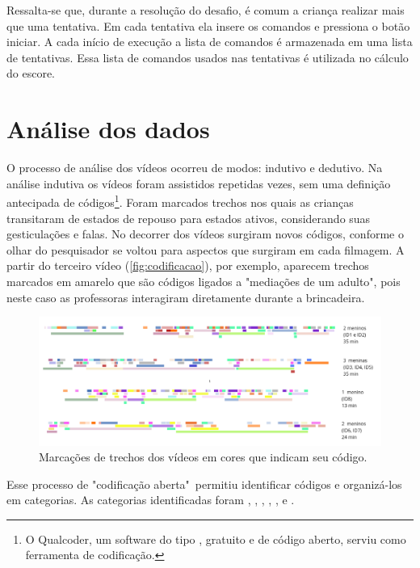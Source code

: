 Ressalta-se que, durante a resolução do desafio, é comum a criança realizar mais que uma tentativa. Em cada tentativa ela insere os comandos e pressiona o botão iniciar. A cada início de execução a lista de comandos é armazenada em uma lista de tentativas. Essa lista de comandos usados nas tentativas é utilizada no cálculo do escore.

\section{Análise dos dados}

O processo de análise dos vídeos ocorreu de modos: indutivo e dedutivo. Na análise indutiva os vídeos foram assistidos repetidas vezes, sem uma definição antecipada de códigos\footnote{O Qualcoder, um software do tipo , gratuito e de código aberto, serviu como ferramenta de codificação.}. Foram marcados trechos nos quais as crianças transitaram de estados de repouso para estados ativos, considerando suas gesticulações e falas. No decorrer dos vídeos surgiram novos códigos, conforme o olhar do pesquisador se voltou para aspectos que surgiram em cada filmagem. A partir do terceiro vídeo (\autoref{fig:codificacao}), por exemplo, aparecem trechos marcados em amarelo que são códigos ligados a "mediações de um adulto", pois neste caso as professoras interagiram diretamente durante a brincadeira.

\begin{figure}[!htpb]
    \centering
    \includegraphics[width=1\linewidth,fbox]{figs/codificacao_aberta.png}
    \caption{Marcações de trechos dos vídeos em cores que indicam seu código.}
    \sourceauthor
    \label{fig:codificacao}
\end{figure}

Esse processo de "codificação aberta"\ permitiu identificar códigos e organizá-los em categorias. As categorias identificadas foram , , , , ,  e .

